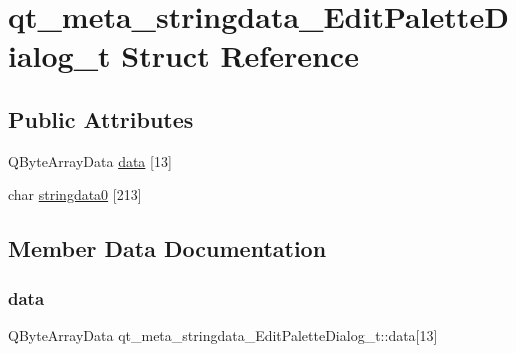 \hypertarget{structqt__meta__stringdata___edit_palette_dialog__t}{}\section{qt\+\_\+meta\+\_\+stringdata\+\_\+\+Edit\+Palette\+Dialog\+\_\+t Struct Reference}
\label{structqt__meta__stringdata___edit_palette_dialog__t}
\subsection*{Public Attributes}
\begin{DoxyCompactItemize}
\item 
Q\+Byte\+Array\+Data \mbox{\hyperlink{structqt__meta__stringdata___edit_palette_dialog__t_a7e4866d0a4f5315d94e8187b2156600c}{data}} \mbox{[}13\mbox{]}
\item 
char \mbox{\hyperlink{structqt__meta__stringdata___edit_palette_dialog__t_ac9b77e0042eeb7ec1c3c8ed7a7ea31b5}{stringdata0}} \mbox{[}213\mbox{]}
\end{DoxyCompactItemize}


\subsection{Member Data Documentation}
\mbox{\label{structqt__meta__stringdata___edit_palette_dialog__t_a7e4866d0a4f5315d94e8187b2156600c}} 
\subsubsection{\texorpdfstring{data}{data}}
{\footnotesize\ttfamily Q\+Byte\+Array\+Data qt\+\_\+meta\+\_\+stringdata\+\_\+\+Edit\+Palette\+Dialog\+\_\+t\+::data\mbox{[}13\mbox{]}}

\mbox{\label{structqt__meta__stringdata___edit_palette_dialog__t_ac9b77e0042eeb7ec1c3c8ed7a7ea31b5}} 
